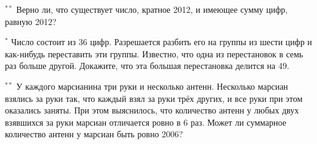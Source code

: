 \begin{thm} $^{\ast\ast}$ 
    Верно ли, что существует число, кратное 2012, и имеющее сумму цифр, равную 2012?
\end{thm}

\begin{thm} $^{\ast}$ 
    Число состоит из 36 цифр. Разрешается разбить его на группы из шести цифр и как-нибудь переставить эти группы. Известно, что одна из перестановок в семь раз больше другой. Докажите, что эта большая перестановка делится на 49.
\end{thm}

\begin{thm} $^{\ast\ast}$ 
    У каждого марсианина три руки и несколько антенн. Несколько марсиан взялись за руки так, что каждый взял за руки трёх других, и все руки при этом оказались заняты. При этом выяснилось, что количество антенн у любых двух взявшихся за руки марсиан отличается ровно в 6 раз. Может ли суммарное количество антенн у марсиан быть ровно 2006?
\end{thm}